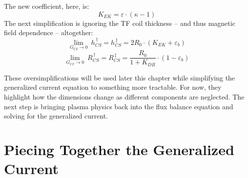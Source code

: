 The new  coefficient, here, is:
\begin{equation}
	K_{EK} = \varepsilon \cdot \left( \kappa - 1 \right)
\end{equation}
The next simplification is ignoring the TF coil thickness -- and thus magnetic field dependence -- altogether:
\begin{equation}
	\label{eq:hcs_simple}
	\underset{G_{CI} \to 0}{\lim} \ h_{CS}^{\,\dagger} = h_{CS}^{\,\ddagger} = 2 R_0 \cdot \left( K_{EK} + \varepsilon_b \right)
\end{equation}
\begin{equation}
	\label{eq:rcs_simple}
	\underset{G_{CI} \to 0}{\lim} \ R_{CS}^{\,\dagger} = R_{CS}^{\,\ddagger} = \frac{ R_0 }{ 1 + K_{DR} } \cdot \left( 1 - \varepsilon_b  \right)
\end{equation}

These oversimplifications will be used later this chapter while simplifying the generalized current equation to something more tractable. For now, they highlight how the dimensions change as different components are neglected. The next step is bringing plasma physics back into the flux balance equation and solving for the generalized current.

\section{Piecing Together the Generalized Current}

